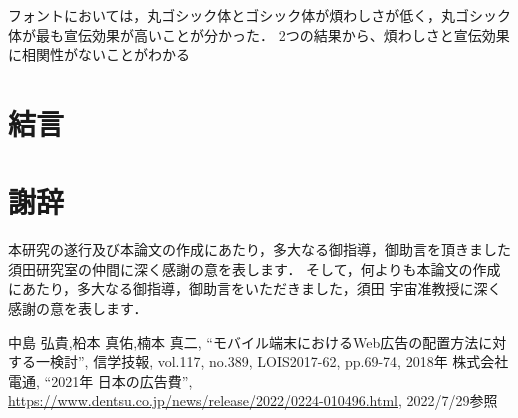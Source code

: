 \documentclass[12pt,a4j,titlepage]{ltjsarticle}
\begin{document}
フォントにおいては，丸ゴシック体とゴシック体が煩わしさが低く，丸ゴシック体が最も宣伝効果が高いことが分かった．
2つの結果から、煩わしさと宣伝効果に相関性がないことがわかる
\clearpage

\section{結言}

\clearpage

\section{謝辞}
本研究の遂行及び本論文の作成にあたり，多大なる御指導，御助言を頂きました須田研究室の仲間に深く感謝の意を表します．
そして，何よりも本論文の作成にあたり，多大なる御指導，御助言をいただきました，須田 宇宙准教授に深く感謝の意を表します．

\clearpage

\begin{thebibliography}{99}
 中島 弘貴,柗本 真佑,楠本 真二, ``モバイル端末におけるWeb広告の配置方法に対する一検討'', 信学技報, vol.117, no.389, LOIS2017-62, pp.69-74, 2018年
 株式会社電通, ``2021年 日本の広告費'', \url{https://www.dentsu.co.jp/news/release/2022/0224-010496.html}, 2022/7/29参照
\end{thebibliography}
\end{document}
